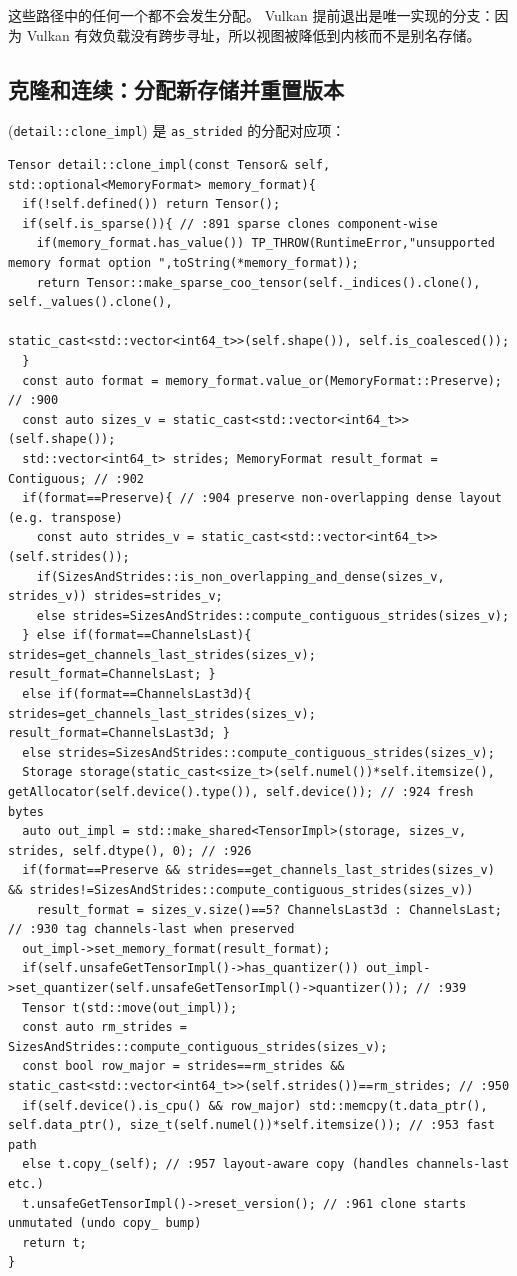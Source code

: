 这些路径中的任何一个都不会发生分配。 Vulkan 提前退出是唯一实现的分支：因为 Vulkan 有效负载没有跨步寻址，所以视图被降低到内核而不是别名存储。

\subsection{克隆和连续：分配新存储并重置版本}
\label{sec:clone}

(\texttt{detail::clone\_impl}) 是 \texttt{as\_strided} 的分配对应项：

\begin{lstlisting}[caption={\texttt{clone\_impl}: fresh storage, reset version.}, label=lst:cloneimpl]
Tensor detail::clone_impl(const Tensor& self, std::optional<MemoryFormat> memory_format){
  if(!self.defined()) return Tensor();
  if(self.is_sparse()){ // :891 sparse clones component-wise
    if(memory_format.has_value()) TP_THROW(RuntimeError,"unsupported memory format option ",toString(*memory_format));
    return Tensor::make_sparse_coo_tensor(self._indices().clone(), self._values().clone(),
                                          static_cast<std::vector<int64_t>>(self.shape()), self.is_coalesced());
  }
  const auto format = memory_format.value_or(MemoryFormat::Preserve); // :900
  const auto sizes_v = static_cast<std::vector<int64_t>>(self.shape());
  std::vector<int64_t> strides; MemoryFormat result_format = Contiguous; // :902
  if(format==Preserve){ // :904 preserve non-overlapping dense layout (e.g. transpose)
    const auto strides_v = static_cast<std::vector<int64_t>>(self.strides());
    if(SizesAndStrides::is_non_overlapping_and_dense(sizes_v, strides_v)) strides=strides_v;
    else strides=SizesAndStrides::compute_contiguous_strides(sizes_v);
  } else if(format==ChannelsLast){ strides=get_channels_last_strides(sizes_v); result_format=ChannelsLast; }
  else if(format==ChannelsLast3d){ strides=get_channels_last_strides(sizes_v); result_format=ChannelsLast3d; }
  else strides=SizesAndStrides::compute_contiguous_strides(sizes_v);
  Storage storage(static_cast<size_t>(self.numel())*self.itemsize(), getAllocator(self.device().type()), self.device()); // :924 fresh bytes
  auto out_impl = std::make_shared<TensorImpl>(storage, sizes_v, strides, self.dtype(), 0); // :926
  if(format==Preserve && strides==get_channels_last_strides(sizes_v) && strides!=SizesAndStrides::compute_contiguous_strides(sizes_v))
    result_format = sizes_v.size()==5? ChannelsLast3d : ChannelsLast; // :930 tag channels-last when preserved
  out_impl->set_memory_format(result_format);
  if(self.unsafeGetTensorImpl()->has_quantizer()) out_impl->set_quantizer(self.unsafeGetTensorImpl()->quantizer()); // :939
  Tensor t(std::move(out_impl));
  const auto rm_strides = SizesAndStrides::compute_contiguous_strides(sizes_v);
  const bool row_major = strides==rm_strides && static_cast<std::vector<int64_t>>(self.strides())==rm_strides; // :950
  if(self.device().is_cpu() && row_major) std::memcpy(t.data_ptr(), self.data_ptr(), size_t(self.numel())*self.itemsize()); // :953 fast path
  else t.copy_(self); // :957 layout-aware copy (handles channels-last etc.)
  t.unsafeGetTensorImpl()->reset_version(); // :961 clone starts unmutated (undo copy_ bump)
  return t;
}
\end{lstlisting}

